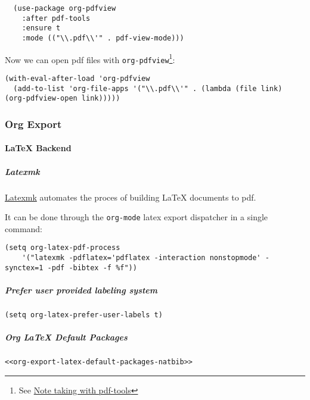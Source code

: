 \documentclass[11pt]{article}
\begin{document}
\begin{verbatim}
  (use-package org-pdfview
    :after pdf-tools
    :ensure t
    :mode (("\\.pdf\\'" . pdf-view-mode)))
\end{verbatim}

Now we can open pdf files with \texttt{org-pdfview}\footnote{See \href{https://matt.hackinghistory.ca/2015/11/11/note-taking-with-pdf-tools/}{Note taking with pdf-tools}}:

\begin{verbatim}
(with-eval-after-load 'org-pdfview
  (add-to-list 'org-file-apps '("\\.pdf\\'" . (lambda (file link) (org-pdfview-open link)))))
\end{verbatim}

\subsubsection*{Org Export}
\label{sec:orgb0e8c33}

\paragraph*{\LaTeX{} Backend}
\label{sec:org090f599}

\subparagraph*{Latexmk}
\label{sec:org8b66e7f}

\href{https://ctan.org/pkg/latexmk?lang=en}{Latexmk} automates the proces of building \LaTeX{} documents to pdf.

It can be done through the \texttt{org-mode} latex export dispatcher in a single command:

\begin{verbatim}
(setq org-latex-pdf-process
    '("latexmk -pdflatex='pdflatex -interaction nonstopmode' -synctex=1 -pdf -bibtex -f %f"))
\end{verbatim}

\subparagraph*{Prefer user provided labeling system}
\label{sec:orgcbe3a8c}

\begin{verbatim}
(setq org-latex-prefer-user-labels t)
\end{verbatim}

\subparagraph*{Org \LaTeX{} Default Packages}
\label{sec:org4055c7d}
\begin{verbatim}
<<org-export-latex-default-packages-natbib>>
\end{verbatim}
\end{document}
